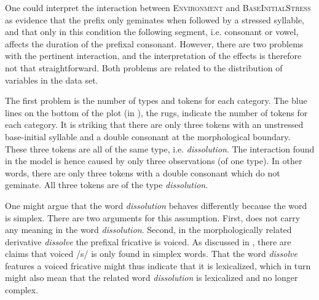 %



One could interpret the interaction between \textsc{Environment} and \textsc{BaseInitialStress} as evidence that the prefix  only geminates when followed by a stressed syllable, and that only in this condition the following segment, i.e. consonant or vowel, affects the duration of the prefixal consonant. However, there are two problems with the pertinent interaction, and the interpretation of the effects is therefore not that straightforward. Both problems are related to the distribution of variables in the data set. 

The first problem is the number of types and tokens for each category. The blue lines on the bottom of the plot (in ), the rugs, indicate the number of tokens for each category. It is striking that there are only three tokens with an unstressed base-initial syllable and a double consonant at the morphological boundary. These three tokens are all of the same type, i.e. \textit{dissolution}. The interaction found in the model is hence caused by only three observations (of one type). In other words, there are only three tokens with a double consonant which do not geminate. All three tokens are of the type \textit{dissolution}. 

One might argue that the word \textit{dissolution} behaves differently because the word is simplex. There are two arguments for this assumption. First,  does not carry any meaning in the word \textit{dissolution}. Second, in the morphologically related derivative \textit{dissolve} the prefixal fricative is voiced. As discussed in , there are claims that voiced /s/ is only found in simplex words. That the word \textit{dissolve} features a voiced fricative might thus indicate that it is lexicalized, which in turn might also mean that the related word \textit{dissolution} is lexicalized and no longer complex.

